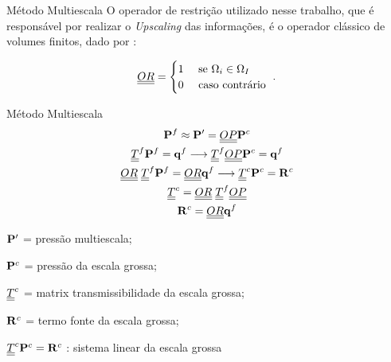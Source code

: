 \documentclass[professionalfont]{beamer}
\begin{document}
\begin{frame}{Método Multiescala}
    O operador de restrição utilizado nesse trabalho, que é responsável por realizar o \textit{Upscaling} das informações, é o operador clássico de volumes finitos, dado por \cite{Tene_2016}:

    \begin{equation}
        \label{eq:multiescala.11}
        \underline{\underline{OR}} = 
        \begin{cases}
            1 & \text{ se } \Omega_{i} \in \Omega_{I}\\
            0 & \text{ caso contrário }
        \end{cases}.
    \end{equation}
\end{frame}

\begin{frame}{Método Multiescala}
    \small
    \begin{gather*}
        \mathbf{P}^{f} \approx \bold{P}' = \underline{\underline{OP}} \bold{P}^{c} \\
        \underline{\underline{T}}^{f} \mathbf{P}^{f} = \mathbf{q}^{f}  \longrightarrow \underline{\underline{T}}^{f} \underline{\underline{OP}} \bold{P}^{c} = \mathbf{q}^{f} \\
        \underline{\underline{OR}} \hspace{0.1cm} \underline{\underline{T}}^{f} \mathbf{P}^{f} = \underline{\underline{OR}} \mathbf{q}^{f}  \longrightarrow \underline{\underline{T}}^{c} \bold{P}^{c} = \bold{R}^{c} \\
        \underline{\underline{T}}^{c} = \underline{\underline{OR}} \hspace{0.1cm} \underline{\underline{T}}^{f} \underline{\underline{OP}} \\
        \bold{R}^{c} = \underline{\underline{OR}} \mathbf{q}^{f}
    \end{gather*}
    \begin{description}
        \item $\bold{P}'$ = pressão multiescala;
        \item $\bold{P}^{c}$ = pressão da escala grossa;
        \item $\underline{\underline{T}}^{c}$ = matrix transmissibilidade da escala grossa;
        \item $\bold{R}^{c}$ = termo fonte da escala grossa;
        \item $\underline{\underline{T}}^{c} \bold{P}^{c} = \bold{R}^{c}$ : sistema linear da escala grossa
    \end{description}
\end{frame}
\end{document}

